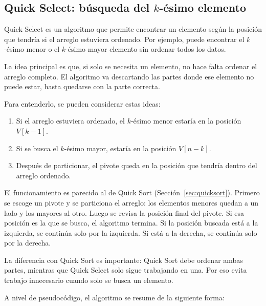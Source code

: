 \subsection{Quick Select: búsqueda del \texorpdfstring{$k$}{k}-ésimo elemento}\label{sec:quickselect}

Quick Select es un algoritmo que permite encontrar un elemento según la posición que tendría si el arreglo estuviera ordenado. Por ejemplo, puede encontrar el $k$-ésimo menor o el $k$-ésimo mayor elemento sin ordenar todos los datos.

La idea principal es que, si solo se necesita un elemento, no hace falta ordenar el arreglo completo. El algoritmo va descartando las partes donde ese elemento no puede estar, hasta quedarse con la parte correcta.

Para entenderlo, se pueden considerar estas ideas:

\begin{enumerate}
    \item Si el arreglo estuviera ordenado, el $k$-ésimo menor estaría en la posición $V[k-1]$.
    \item Si se busca el $k$-ésimo mayor, estaría en la posición $V[n-k]$.
    \item Después de particionar, el pivote queda en la posición que tendría dentro del arreglo ordenado.
\end{enumerate}

El funcionamiento es parecido al de Quick Sort (Sección~\ref{sec:quicksort}). Primero se escoge un pivote y se particiona el arreglo: los elementos menores quedan a un lado y los mayores al otro. Luego se revisa la posición final del pivote. Si esa posición es la que se busca, el algoritmo termina. Si la posición buscada está a la izquierda, se continúa solo por la izquierda. Si está a la derecha, se continúa solo por la derecha.

La diferencia con Quick Sort es importante: Quick Sort debe ordenar ambas partes, mientras que Quick Select solo sigue trabajando en una. Por eso evita trabajo innecesario cuando solo se busca un elemento.


A nivel de pseudocódigo, el algoritmo se resume de la siguiente forma:

